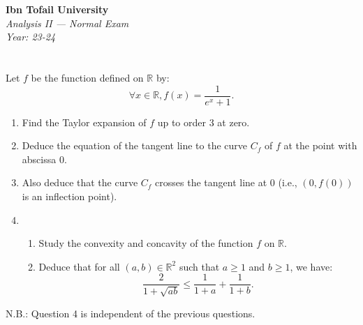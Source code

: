 \documentclass[12pt]{article}
\begin{document}
\begin{center}
  \Large\textbf{Ibn Tofail University} \\[1em]
  \large\textit{Analysis II — Normal Exam} \\[0.5em]
  \large\textit{Year: 23-24} \\[2em]
\end{center}

\vspace{0.5cm}

\section{}
Let $f$ be the function defined on $\mathbb{R}$ by:
$$\forall x \in \mathbb{R}, f(x) = \frac{1}{e^x + 1}.$$

\begin{enumerate}
\item Find the Taylor expansion of $f$ up to order 3 at zero.
\item Deduce the equation of the tangent line to the curve $C_f$ of $f$ at the point with abscissa 0.
\item Also deduce that the curve $C_f$ crosses the tangent line at 0 (i.e., $(0, f(0))$ is an inflection point).
\item \begin{enumerate}
   \item Study the convexity and concavity of the function $f$ on $\mathbb{R}$.
   \item Deduce that for all $(a, b) \in \mathbb{R}^2$ such that $a \geq 1$ and $b \geq 1$, we have:
   $$\frac{2}{1 + \sqrt{ab}} \leq \frac{1}{1 + a} + \frac{1}{1 + b}.$$
   \end{enumerate}
\end{enumerate}
N.B.: Question 4 is independent of the previous questions.

\newpage
\end{document}
